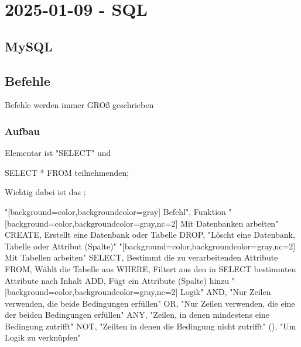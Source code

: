 \section{2025-01-09 - SQL}

\subsection{MySQL}


\subsection{Befehle}

\startitemize[packed]
\item Befehle werden immer GROß geschrieben
\stopitemize

\subsubsection{Aufbau}

Elementar ist "SELECT" und 

\starttyping
SELECT * FROM teilnehmenden;
\stoptyping

Wichtig dabei ist das ; 

\startplacetable[location={here},title={SQL Basic Befehle}]
\setupTABLE[r][1][background=color,backgroundcolor=gray]
\setupTABLE[c][1][background=color,backgroundcolor=lightgray]
\bTABLE[offset=1mm]
\startCSV
"[background=color,backgroundcolor=gray] Befehl", Funktion
"[background=color,backgroundcolor=gray,nc=2] Mit Datenbanken arbeiten"
CREATE, Erstellt eine Datenbank oder Tabelle
DROP, "Löscht eine Datenbank, Tabelle oder Attribut (Spalte)"
"[background=color,backgroundcolor=gray,nc=2] Mit Tabellen arbeiten"
SELECT, Bestimmt die zu verarbeitenden Attribute
FROM, Wählt die Tabelle aus
WHERE, Filtert aus den in SELECT bestimmten Attribute nach Inhalt
ADD, Fügt ein Attribute (Spalte) hinzu
"[background=color,backgroundcolor=gray,nc=2] Logik"
AND, "Nur Zeilen verwenden, die beide Bedingungen erfüllen"
OR, "Nur Zeilen verwenden, die eine der beiden Bedingungen erfüllen"
ANY, "Zeilen, in denen mindestens eine Bedingung zutrifft"
NOT, "Zeilten in denen die Bedingung nicht zutrifft"
(), "Um Logik zu verknüpfen"
\stopCSV
\eTABLE
\stopplacetable

